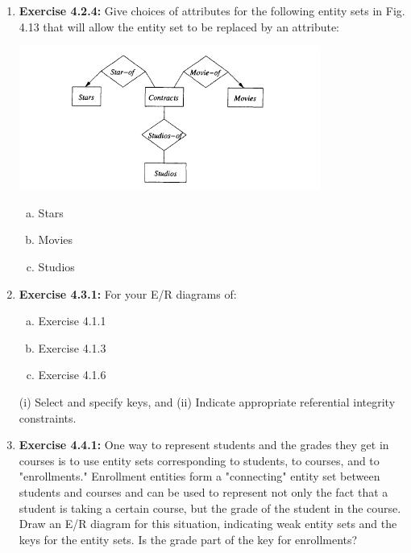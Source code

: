 \documentclass[12pt]{article}
\begin{document}
\begin{enumerate}[1.]
    \item \textbf{Exercise 4.2.4:} Give choices of attributes for the following entity sets in
    Fig. 4.13 that will allow the entity set to be replaced by an attribute:

    \bigskip

    \begin{center}
    \includegraphics[width=0.7\linewidth]{images/worksheet_14_7.png}
    \end{center}

    \begin{enumerate}[a)]
        \item Stars
        \item Movies
        \item Studios
    \end{enumerate}

    \item \textbf{Exercise 4.3.1:} For your E/R diagrams of:

    \bigskip

    \begin{enumerate}[a)]
        \item Exercise 4.1.1
        \item Exercise 4.1.3
        \item Exercise 4.1.6
    \end{enumerate}

    \bigskip

    (i) Select and specify keys, and (ii) Indicate appropriate referential integrity constraints.

    \item \textbf{Exercise 4.4.1:} One way to represent students and the grades they get in
    courses is to use entity sets corresponding to students, to courses, and to "enrollments."
    Enrollment entities form a "connecting" entity set between students
    and courses and can be used to represent not only the fact that a student is
    taking a certain course, but the grade of the student in the course. Draw an
    E/R diagram for this situation, indicating weak entity sets and the keys for the
    entity sets. Is the grade part of the key for enrollments?


\end{enumerate}
\end{document}

